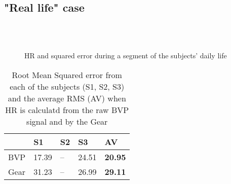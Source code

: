 \FloatBarrier
\pagebreak

\subsection{"Real life" case}


\begin{figure}[!h]
	\centering
	\\
	\\
	\caption{HR and squared error during a segment of the subjects' daily life}
	\label{fig:real}
\end{figure}

\begin{table}[!h]
	\label{table:real}
	\centering
	\caption{Root Mean Squared error from each of the subjects (S1, S2, S3) and the average RMS (AV) when HR is calculatd from the raw BVP signal and by the Gear}
	\begin{tabular}{l|l|l|l|l|}
		\cline{2-5}
		& S1    & S2 & S3    & \textbf{AV}    \\ \hline
		\multicolumn{1}{|l|}{BVP}  & 17.39 & -- & 24.51 & \textbf{20.95} \\ \hline
		\multicolumn{1}{|l|}{Gear} & 31.23 & -- & 26.99 & \textbf{29.11} \\ \hline
	\end{tabular}
\end{table}

\FloatBarrier


